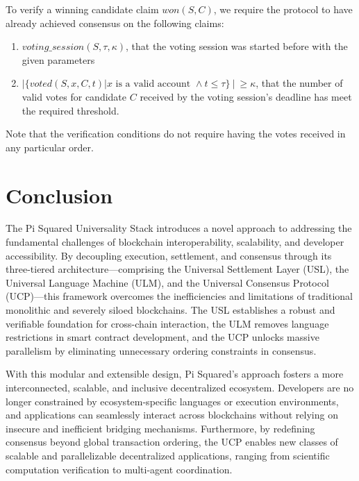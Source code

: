 \documentclass{article}
\newcommand{\UniCon}{Universal Consensus Protocol}
\newcommand{\UC}{UCP}
\begin{document}
To verify a winning candidate claim $won(S, C)$, we require the protocol to have already achieved consensus on the following claims:
\begin{enumerate}
    \item $\textit{voting\_session}(S, \tau, \kappa)$, that the voting session was started before with the given parameters
    \item $|\{ \textit{voted}(S, x, C, t) | x \text{ is a valid account } \land t \leq \tau\} ~|~ \geq \kappa$, that the number of valid votes for candidate $C$ received by the voting session's deadline has meet the required threshold.
\end{enumerate}
Note that the verification conditions do not require having the votes received in any particular order.



\section{Conclusion}

The Pi Squared Universality Stack introduces a novel approach to addressing the fundamental challenges of blockchain interoperability, scalability, and developer accessibility. By decoupling execution, settlement, and consensus through its three-tiered architecture—comprising the Universal Settlement Layer (USL), the Universal Language Machine (ULM), and the \UniCon{} (\UC{})—this framework overcomes the inefficiencies and limitations of traditional monolithic and severely siloed blockchains. The USL establishes a robust and verifiable foundation for cross-chain interaction, the ULM removes language restrictions in smart contract development, and the \UC{} unlocks massive parallelism by eliminating unnecessary ordering constraints in consensus.

With this modular and extensible design, Pi Squared’s approach fosters a more interconnected, scalable, and inclusive decentralized ecosystem. Developers are no longer constrained by ecosystem-specific languages or execution environments, and applications can seamlessly interact across blockchains without relying on insecure and inefficient bridging mechanisms. Furthermore, by redefining consensus beyond global transaction ordering, the \UC{} enables new classes of scalable and parallelizable decentralized applications, ranging from scientific computation verification to multi-agent coordination.
\end{document}
